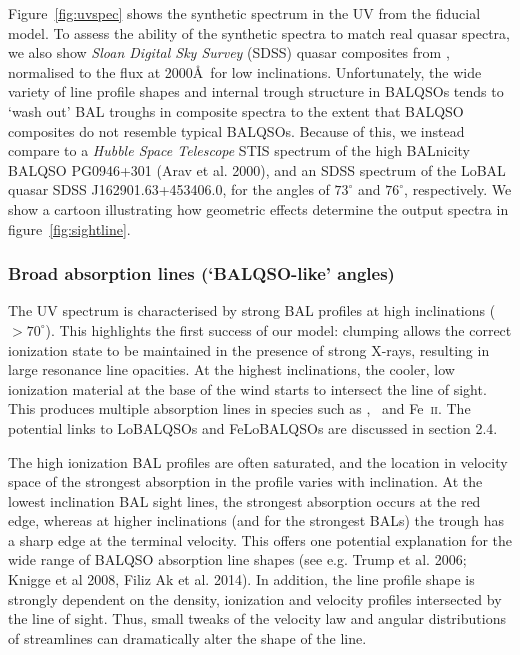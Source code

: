\documentclass[useAMS,usenatbib]{mn2e_x}
\begin{document}
\noindent
Figure~\ref{fig:uvspec} shows the synthetic spectrum in the UV from the fiducial model. 
To assess the ability of the synthetic spectra to match real 
quasar spectra, we also show {\sl Sloan Digital Sky Survey} (SDSS) quasar
composites from \cite{reichard2003}, normalised to the flux at 2000\AA\
for low inclinations. Unfortunately, the wide variety of
line profile shapes and internal trough structure in BALQSOs
tends to `wash out' BAL troughs in composite spectra
to the extent that BALQSO composites do not resemble typical BALQSOs.
Because of this, we instead compare to a {\sl Hubble Space Telescope} 
STIS spectrum of the high BALnicity BALQSO PG0946+301 (Arav et al. 2000),
and an SDSS spectrum of the LoBAL quasar SDSS J162901.63+453406.0,
for the angles of $73^\circ$ and $76^\circ$, respectively. 
We show a cartoon illustrating how geometric effects determine
the output spectra in figure~\ref{fig:sightline}.  

\subsubsection{Broad absorption lines (`BALQSO-like' angles)}

The UV spectrum is characterised by strong BAL 
profiles at high inclinations ($> 70^\circ$). 
This highlights the first success of our model: 
clumping allows the correct ionization state 
to be maintained in the presence of strong X-rays, 
resulting in large resonance line opacities. 
At the highest inclinations, the 
cooler, low ionization material at the base of the wind
starts to intersect the line of sight. This produces 
multiple absorption lines in species such as \mg,
\al\ and Fe~\textsc{ii}. The potential links to LoBALQSOs and 
FeLoBALQSOs are discussed in section 2.4.

The high ionization BAL profiles are often saturated, and the location in velocity space
of the strongest absorption in the profile varies with inclination.
At the lowest inclination BAL sight lines, the strongest absorption occurs at the red edge,
whereas at higher inclinations (and for the strongest BALs)
the trough has a sharp edge at the terminal velocity.
This offers one potential explanation for the wide range of BALQSO absorption
line shapes (see e.g. Trump et al. 2006; Knigge et al 2008, Filiz Ak et al. 2014).
In addition, the line profile shape is strongly dependent 
on the density, ionization and velocity 
profiles intersected by the line of sight. Thus, small tweaks of the velocity
law and angular distributions of streamlines can dramatically alter
the shape of the line.
\end{document}
